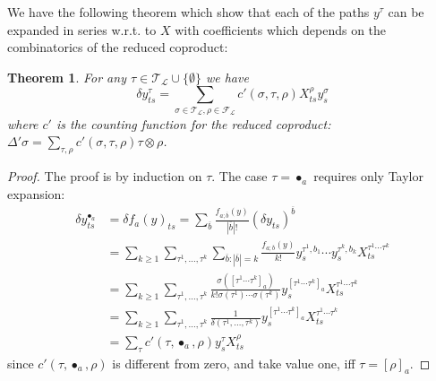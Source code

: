 \documentclass[a4paper,11pt,reqno]{article}
\newcommand{\ol}[1]{\overline{#1}}
\newcommand{\1}{{\bf 1}}
\newcommand{\der}{\delta}
\newcommand{\FF}{\mathcal{F}}
\newcommand{\LL}{\mathcal{L}}
\newtheorem{theorem}{Theorem}[section]
\newcommand{\TT}{\mathcal{T}}
\newcommand{\troot}{\bullet}
\begin{document}
We have the following theorem which show that each of the paths $y^\tau$ can be expanded in series w.r.t. to $X$ with coefficients which depends on the combinatorics of the reduced coproduct:

\begin{theorem}
\label{th:der-eqns-1}
For any $\tau \in \TT_\LL\cup \{ \emptyset \}$ we have
\begin{equation}
  \label{eq:ytau-der}
\der y^\tau_{ts} = \sum_{\sigma \in \TT_\LL, \rho \in \FF_\LL} c'(\sigma,\tau,\rho) X^{\rho}_{ts} y^{\sigma}_s  
\end{equation}
where $c'$ is the counting function for the reduced coproduct:
$
\Delta' \sigma = \sum_{\tau,\rho} c'(\sigma,\tau,\rho) \tau \otimes \rho
$.
\end{theorem}

\begin{proof}
The proof is by induction on $\tau$. The case $\tau = \troot_a$ requires only Taylor expansion:
\begin{equation}
  \label{eq:ytau-step-0}
  \begin{split}
\der y^{\troot_a}_{ts} & = \der f_a(y)_{ts} = \sum_{\ol b} \frac{f_{a; \ol b}(y)}{|\ol b|!} \left( \der y_{ts}\right)^{\ol b} 
\\  & = \sum_{k \ge 1} \sum_{\tau^1,\dots,\tau^{k}} \sum_{\ol b: |\ol b|=k} \frac{f_{a; \ol b}(y)}{k!}  y^{\tau^1,b_1}_s \cdots y^{\tau^k,b_k}_s X^{\tau^1 \cdots \tau^k}_{ts}
\\  & = \sum_{k \ge 1} \sum_{\tau^1,\dots,\tau^{k}} \frac{\sigma([\tau^1 \cdots \tau^k]_a)}{k! \sigma(\tau^1)\cdots\sigma(\tau^k)} y^{[\tau^1 \cdots \tau^k]_a}_s X^{\tau^1 \cdots \tau^k}_{ts}
\\  & = \sum_{k \ge 1} \sum_{\tau^1,\dots,\tau^{k}} \frac{1}{\delta(\tau^1,\dots,\tau^k)} y^{[\tau^1 \cdots \tau^k]_a}_s X^{\tau^1 \cdots \tau^k}_{ts}
\\  & = \sum_{\tau}  c'(\tau,\troot_a,\rho) y^{\tau}_s X^{\rho}_{ts}
  \end{split}
\end{equation}
since $c'(\tau,\troot_a,\rho) $ is different from zero, and take value one, iff $\tau = [\rho]_a$.


\end{proof}
\end{document}
